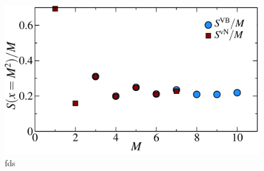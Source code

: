 \begin{figure} {
	\centering
	\includegraphics[width=5in]{./figures/made/marea.pdf} 
	\caption[fds]{ fds
	\label{2Dbetter}
	}
} \end{figure}
